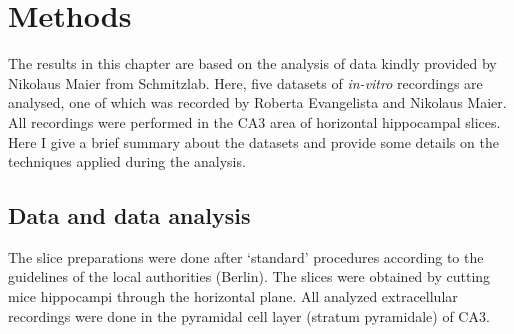   \begin{comment}
    A differential short-term depression of I-to-E and I-to-I synapses could
    also explain the observed correlation between SWR amplitude and the
    following interval to the next SWR. For simplicity we neglect short-term
    depression of I-to-E synapses. The recovery from depression (after a SWR)
    of I-to-I synapses (Kohus et al., 2016) increases these synapses with a
    time constant on the order of hundreds of milliseconds. As a result, the
    activity of the inhibitory neurons gradually decreases, which in turn
    reduces the inhibition onto pyramidal cells. Pyramidal cells in CA3 slowly
    increase their activity long before a SWR (Hulse et al, 2016) until some
    critical activity level is reached where additional fluctuations/noise can
    trigger a new SWR.
  \end{comment}



\section{Methods}
  The results in this chapter are based on the analysis of data kindly provided
  by Nikolaus Maier from Schmitzlab. Here, five datasets of {\it in-vitro}
  recordings are analysed, one of which was recorded by Roberta Evangelista and
  Nikolaus Maier. All recordings were performed in the CA3 area of horizontal
  hippocampal slices. Here I give a brief summary about the datasets and
  provide some details on the techniques applied during the analysis.


  \subsection{Data and data analysis}
    The slice preparations were done after `standard' procedures
    \citep{Maier2003, Maier2012} according to the guidelines of the local
    authorities (Berlin). The slices were obtained by cutting mice hippocampi
    through the horizontal plane. All analyzed extracellular recordings were
    done in the pyramidal cell layer (stratum pyramidale) of CA3.

